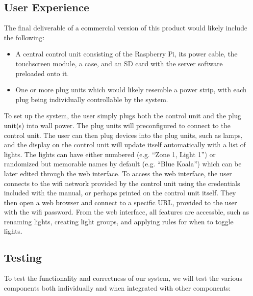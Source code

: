 \subsection{User Experience}

The final deliverable of a commercial version of this product would likely
include the following:

\begin{itemize}
    \item A central control unit consisting of the Raspberry Pi, its power
        cable, the touchscreen module, a case, and an SD card with the server
        software preloaded onto it.
    \item One or more plug units which would likely resemble a power strip,
        with each plug being individually controllable by the system.
\end{itemize}

To set up the system, the user simply plugs both the control unit and the plug
unit(s) into wall power.  The plug units will preconfigured to connect to the
control unit.  The user can then plug devices into the plug units, such as
lamps, and the display on the control unit will update itself automatically
with a list of lights.  The lights can have either numbered (e.g. ``Zone 1,
Light 1'') or randomized but memorable names by default (e.g. ``Blue Koala'')
which can be later edited through the web interface.  To access the web
interface, the user connects to the wifi network provided by the control unit
using the credentials included with the manual, or perhaps printed on the
control unit itself.  They then open a web browser and connect to a specific
URL, provided to the user with the wifi password.  From the web interface, all
features are accessble, such as renaming lights, creating light groups, and
applying rules for when to toggle lights.

\subsection{Testing}

To test the functionality and correctness of our system, we will test the
various components both individually and when integrated with other components:


